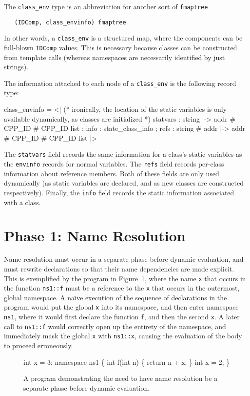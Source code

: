 \documentclass[11pt]{article}
\newcommand{\naive}{na\"\i{}ve}
\begin{document}
The \texttt{class_env} type is an abbreviation for another sort of
\texttt{fmaptree}
\begin{verbatim}
   (IDComp, class_envinfo) fmaptree
\end{verbatim}
In other words, a \texttt{class_env} is a structured map, where the
components can be full-blown \texttt{IDComp} values.  This is
necessary because classes can be constructed from template calls
(whereas namespaces are necessarily identified by just strings).

The information attached to each node of a \texttt{class_env} is the
following record type:
\begin{stdrule}
   class_envinfo = <|
      (* ironically, the location of the static variables is
         only available dynamically, as classes are
         initialized *)
      statvars : string |-> addr # CPP_ID # CPP_ID list ;
      info     : state_class_info ;
      refs     : string # addr |-> addr # CPP_ID # CPP_ID list
   |>
\end{stdrule}
The \texttt{statvars} field records the same information for a class's
static variables as the \texttt{envinfo} records for normal
variables.  The \texttt{refs} field records per-class information
about reference members.  Both of these fields are only used
dynamically (as static variables are declared, and as new classes are
constructed respectively).  Finally, the \texttt{info} field records
the static information associated with a class.



\section{Phase 1: Name Resolution}
\label{sec:phase1}

Name resolution must occur in a separate phase before dynamic
evaluation, and must rewrite declarations so that their name
dependencies are made explicit.  This is exemplified by the program in
Figure~\ref{fig:name-res-separate-phase}, where the name \texttt{x}
that occurs in the function \texttt{ns1::f} must be a reference to the
\texttt{x} that occurs in the outermost, global namespace.  A \naive{}
execution of the sequence of declarations in the program would put the
global \texttt{x} into its namespace, and then enter namespace
\texttt{ns1}, where it would first declare the function \texttt{f},
and then the second \texttt{x}.  A later call to \texttt{ns1::f} would
correctly open up the entirety of the namespace, and immediately mask
the global \texttt{x} with \texttt{ns1::x}, causing the evaluation of
the body to proceed erroneously.
\begin{figure}[htbp]
\begin{stdrule}
   int x = 3;
   namespace ns1 \{
     int f(int n) \{ return n + x; \}
     int x = 2;
   \}
\end{stdrule}
\caption[A Program Requiring Name Resolution]{A program
    demonstrating the need to have name resolution be a separate phase
    before dynamic evaluation.}
\label{fig:name-res-separate-phase}
\end{figure}
\end{document}
